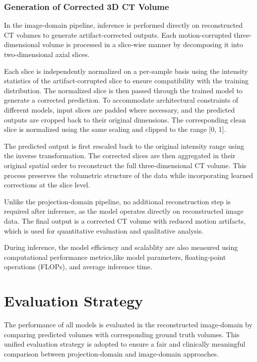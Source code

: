 \subsubsection{Generation of Corrected 3D CT Volume  }
In the image-domain pipeline, inference is performed directly on reconstructed CT volumes to generate artifact-corrected outputs. Each motion-corrupted three-dimensional volume is processed in a slice-wise manner by decomposing it into two-dimensional axial slices.

Each slice is independently normalized on a per-sample basis using the intensity statistics of the artifact-corrupted slice to ensure compatibility with the training distribution. The normalized slice is then passed through the trained model to generate a corrected prediction. To accommodate architectural constraints of different models, input slices are padded where necessary, and the predicted outputs are cropped back to their original dimensions. The corresponding clean slice is normalized using the same scaling and clipped to the range [0, 1]. 

The predicted output is first rescaled back to the original intensity range using the inverse transformation. The corrected slices are then aggregated in their original spatial order to reconstruct the full three-dimensional CT volume. This process preserves the volumetric structure of the data while incorporating learned corrections at the slice level.

Unlike the projection-domain pipeline, no additional reconstruction step is required after inference, as the model operates directly on reconstructed image data. The final output is a corrected CT volume with reduced motion artifacts, which is used for quantitative evaluation and qualitative analysis.

During inference, the model efficiency and scalablity are also measured using computational performance metrics,like model parameters, floating-point operations (FLOPs), and average inference time. 








\section{Evaluation Strategy}

The performance of all models is evaluated in the reconstructed image-domain by comparing predicted volumes with corresponding ground truth volumes. This unified evaluation strategy is adopted to ensure a fair and clinically meaningful comparison between projection-domain and image-domain approaches.

